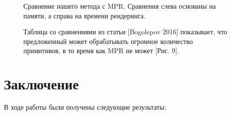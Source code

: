 \documentclass[a4paper,hidelinks,12pt]{article}
\begin{document}
\begin{figure}[H]
  \centering
  \caption{Сравнение нашего метода с MPR. Сравнения слева основаны на памяти, а справа на времени рендеринга.}
  \label{fig:my_label}
\end{figure}

\begin{figure}[H]
  \centering
  \caption{Таблица со сравнениями из статьи [Bogolepov 2016] показывает, что предложенный может обрабатывать огромное количество примитивов, в то время как MPR не может [Рис. 9].}
  \label{fig:my_label}
\end{figure}

\section{Заключение}

В ходе работы были получены следующие результаты:
\end{document}
